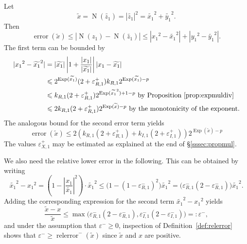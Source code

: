 \documentclass [12pt]{article}
\newcommand {\corr}[1]{{#1}}
\newcommand {\appro}[1]{\widetilde {#1}}
\DeclareMathOperator{\Exp}{\operatorname {Exp}}
\newcommand{\error}{\operatorname {error}}
\newcommand{\relerror}{\operatorname {relerror}}
\newcommand{\Norm}{\operatorname {N}}
\renewcommand {\epsilon}{\varepsilon}
\renewcommand {\leq}{\leqslant}
\renewcommand {\geq}{\geqslant}
\begin{document}
Let
\[
\appro x = \Norm (\appro {z_1}) = |\appro {z_1}|^2
= \appro {x_1}^2 + \appro {y_1}^2.
\]
Then
\[
\error (\appro x) \leq
| \Norm (\corr {z_1}) - \Norm (\appro {z_1}) |
\leq | \corr {x_1}^2 - \appro {x_1}^2 | + | \corr {y_1}^2 - \appro {y_1}^2 |.
\]
The first term can be bounded by
\begin {align*}
| \corr {x_1}^2 - \appro {x_1}^2 |
& = |\appro {x_1}| \left| 1 + \frac {|\corr {x_1}|}{|\appro {x_1}|} \right|
    |\corr {x_1} - \appro {x_1}| \\
& \leq 2^{\Exp (\appro {x_1})} (2 + \epsilon_{R, 1}^+) k_{R, 1}
2^{\Exp (\appro {x_1}) - p} \\
& \leq k_{R, 1} (2 + \epsilon_{R, 1}^+) 2^{\Exp (\appro {x_1}^2) + 1 - p}
\text { by Proposition~\ref {prop:expmuldiv}} \\
& \leq 2 k_{R, 1} (2 + \epsilon_{R, 1}^+) 2^{\Exp (\appro x) - p}
\text { by the monotonicity of the exponent.}
\end {align*}
The analogous bound for the second error term yields
\begin {equation}
\label {eq:propnorm}
\error (\appro x) \leq
  2 \left(
       k_{R, 1} (2 + \epsilon_{R, 1}^+)
     + k_{I, 1} (2 + \epsilon_{I, 1}^+)
\right)
2^{\Exp (\appro x) - p}
\end {equation}
The values $\epsilon_{X, 1}^+$ may be estimated as explained at the end
of \S\ref {sssec:propmul}.

We also need the relative lower error in the following. This can be obtained
by writing
\[
\appro {x_1}^2 - \corr {x_1}^2
=
\left( 1 - \left| \frac {\corr {x_1}}{\appro {x_1}} \right|^2 \right)
\cdot \appro {x_1}^2
\leq
\big( 1 - (1 - \epsilon_{R, 1}^-)^2 \big) \appro {x_1}^2
=
\big( \epsilon_{R, 1}^- (2 - \epsilon_{R, 1}^-) \big) \appro {x_1}^2.
\]
Adding the corresponding expression for the second term
$\appro {x_1}^2 - \corr {x_1}^2$ yields
\begin {equation}
\label {eq:propnormepsminus}
\frac {\appro x - \corr x}{\appro x}
\leq
\max \big(
   \epsilon_{R, 1}^- (2 - \epsilon_{R, 1}^-),
   \epsilon_{I, 1}^- (2 - \epsilon_{I, 1}^-)
\big)
=: \epsilon^-,
\end {equation}
and under the assumption that $\epsilon^- \geq 0$, inspection of
Definition~\ref {def:relerror} shows that
$\epsilon^- \geq \relerror^- (\appro x)$ since
$\appro x$ and $\corr x$ are positive.
\end{document}
